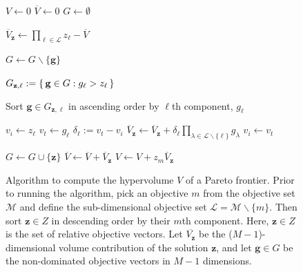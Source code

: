 \newpage
\begin{figure}[H]
\caption[Algorithm to compute the hypervolume indicator of a Pareto frontier]{Algorithm to compute the hypervolume $V$ of a Pareto frontier. Prior to running the algorithm, pick an objective $m$ from the objective set $\mathcal{M}$ and define the sub-dimensional objective set $\mathcal{L} = \mathcal{M} \backslash \{m\}$. Then sort $\mathbf{z} \in Z$ in descending order by their $m$th component. Here, $\mathbf{z} \in Z$ is the set of relative objective vectors. Let $\overbar{V_\mathbf{z}}$ be the ($M-1$)-dimensional volume contribution of the solution $\mathbf{z}$, and let $\mathbf{g} \in G$ be the non-dominated objective vectors in $M-1$ dimensions.}
\label{algo:HypervolAlgo}
\begin{algorithmic}[1]

\State $V \gets 0$
\State $\overbar{V} \gets 0$
\State $G \gets \emptyset$


	\State $\overbar{V}_\mathbf{z} \gets \prod_{\ell \in \mathcal{L}} z_\ell - \overbar{V}$
		
			\State $G \gets G \backslash \{\mathbf{g}\}$
		\EndIf
	\EndFor
	
	
		\State $G_{\mathbf{z},\ell} := \set{\mathbf{g} \in G : g_\ell > z_\ell}$
		
		\State Sort $\mathbf{g} \in G_{\mathbf{z},\ell}$ in ascending order by $\ell$th component, $g_\ell$
		
		\State $v_i \gets z_\ell$
			\State $v_t \gets g_\ell$
			\State $\delta_\ell := v_t - v_i$
			\State $\overbar{V}_\mathbf{z} \gets \overbar{V}_\mathbf{z} + \delta_\ell \prod_{\lambda \in \mathcal{L} \backslash \{\ell\}} g_\lambda$
			\State $v_i \gets v_t$
		\EndFor
		
	\EndFor
	
	\State $G \gets G \cup \{\mathbf{z}\}$
	\State $\overbar{V} \gets \overbar{V} + \overbar{V}_\mathbf{z}$
	\State $V \gets V + z_m \overbar{V}_\mathbf{z}$
\EndFor


\end{algorithmic}
\end{figure}

